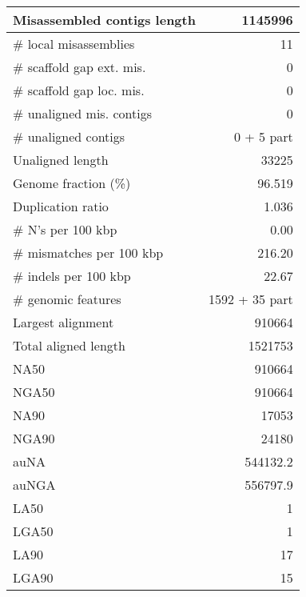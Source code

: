 \documentclass[12pt,a4paper]{article}
\begin{document}
\begin{table}[ht]
\begin{center}
\begin{tabular}{|l*{1}{|r}|}
Misassembled contigs length & 1145996 \\ \hline
\# local misassemblies & 11 \\ \hline
\# scaffold gap ext. mis. & 0 \\ \hline
\# scaffold gap loc. mis. & 0 \\ \hline
\# unaligned mis. contigs & 0 \\ \hline
\# unaligned contigs & 0 + 5 part \\ \hline
Unaligned length & 33225 \\ \hline
Genome fraction (\%) & 96.519 \\ \hline
Duplication ratio & 1.036 \\ \hline
\# N's per 100 kbp & 0.00 \\ \hline
\# mismatches per 100 kbp & 216.20 \\ \hline
\# indels per 100 kbp & 22.67 \\ \hline
\# genomic features & 1592 + 35 part \\ \hline
Largest alignment & 910664 \\ \hline
Total aligned length & 1521753 \\ \hline
NA50 & 910664 \\ \hline
NGA50 & 910664 \\ \hline
NA90 & 17053 \\ \hline
NGA90 & 24180 \\ \hline
auNA & 544132.2 \\ \hline
auNGA & 556797.9 \\ \hline
LA50 & 1 \\ \hline
LGA50 & 1 \\ \hline
LA90 & 17 \\ \hline
LGA90 & 15 \\ \hline
\end{tabular}
\end{center}
\end{table}
\end{document}
